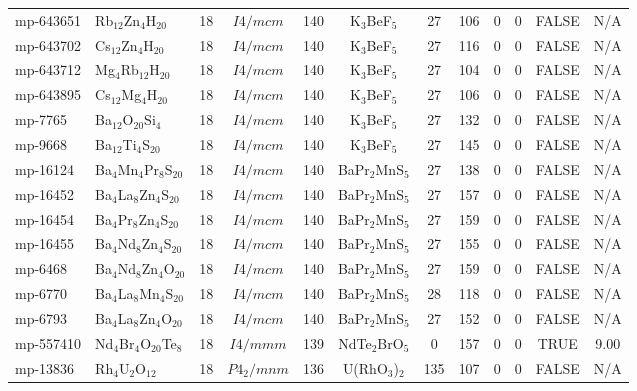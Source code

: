 {\begin{longtable}{llcccccccccc}
    mp-643651 & Rb$_{12}$Zn$_{4}$H$_{20}$ & 18    & $I4/mcm$ & 140   & K$_{3}$BeF$_{5}$ & 27    & 106   & 0     & 0     & FALSE & N/A \\
    mp-643702 & Cs$_{12}$Zn$_{4}$H$_{20}$ & 18    & $I4/mcm$ & 140   & K$_{3}$BeF$_{5}$ & 27    & 116   & 0     & 0     & FALSE & N/A \\
    mp-643712 & Mg$_{4}$Rb$_{12}$H$_{20}$ & 18    & $I4/mcm$ & 140   & K$_{3}$BeF$_{5}$ & 27    & 104   & 0     & 0     & FALSE & N/A \\
    mp-643895 & Cs$_{12}$Mg$_{4}$H$_{20}$ & 18    & $I4/mcm$ & 140   & K$_{3}$BeF$_{5}$ & 27    & 106   & 0     & 0     & FALSE & N/A \\
    mp-7765 & Ba$_{12}$O$_{20}$Si$_{4}$ & 18    & $I4/mcm$ & 140   & K$_{3}$BeF$_{5}$ & 27    & 132   & 0     & 0     & FALSE & N/A \\
    mp-9668 & Ba$_{12}$Ti$_{4}$S$_{20}$ & 18    & $I4/mcm$ & 140   & K$_{3}$BeF$_{5}$ & 27    & 145   & 0     & 0     & FALSE & N/A \\
    mp-16124 & Ba$_{4}$Mn$_{4}$Pr$_{8}$S$_{20}$ & 18    & $I4/mcm$ & 140   & BaPr$_{2}$MnS$_{5}$ & 27    & 138   & 0     & 0     & FALSE & N/A \\
    mp-16452 & Ba$_{4}$La$_{8}$Zn$_{4}$S$_{20}$ & 18    & $I4/mcm$ & 140   & BaPr$_{2}$MnS$_{5}$ & 27    & 157   & 0     & 0     & FALSE & N/A \\
    mp-16454 & Ba$_{4}$Pr$_{8}$Zn$_{4}$S$_{20}$ & 18    & $I4/mcm$ & 140   & BaPr$_{2}$MnS$_{5}$ & 27    & 159   & 0     & 0     & FALSE & N/A \\
    mp-16455 & Ba$_{4}$Nd$_{8}$Zn$_{4}$S$_{20}$ & 18    & $I4/mcm$ & 140   & BaPr$_{2}$MnS$_{5}$ & 27    & 155   & 0     & 0     & FALSE & N/A \\
    mp-6468 & Ba$_{4}$Nd$_{8}$Zn$_{4}$O$_{20}$ & 18    & $I4/mcm$ & 140   & BaPr$_{2}$MnS$_{5}$ & 27    & 159   & 0     & 0     & FALSE & N/A \\
    mp-6770 & Ba$_{4}$La$_{8}$Mn$_{4}$S$_{20}$ & 18    & $I4/mcm$ & 140   & BaPr$_{2}$MnS$_{5}$ & 28    & 118   & 0     & 0     & FALSE & N/A \\
    mp-6793 & Ba$_{4}$La$_{8}$Zn$_{4}$O$_{20}$ & 18    & $I4/mcm$ & 140   & BaPr$_{2}$MnS$_{5}$ & 27    & 152   & 0     & 0     & FALSE & N/A \\
    mp-557410 & Nd$_{4}$Br$_{4}$O$_{20}$Te$_{8}$ & 18    & $I4/mmm$ & 139   & NdTe$_{2}$BrO$_{5}$ & 0     & 157   & 0     & 0     & TRUE  & 9.00  \\
    mp-13836 & Rh$_{4}$U$_{2}$O$_{12}$ & 18    & $P4_2/mnm$ & 136   & U(RhO$_{3}$)$_{2}$ & 135   & 107   & 0     & 0     & FALSE & N/A \\

\end{longtable}}
